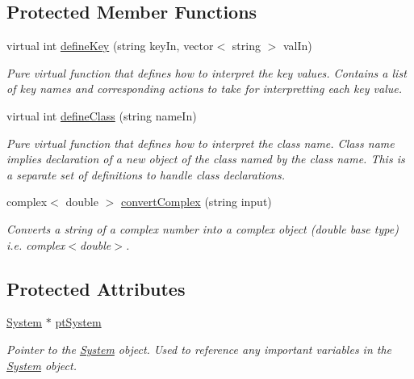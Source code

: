 \subsection*{Protected Member Functions}
\begin{DoxyCompactItemize}
\item 
virtual int \hyperlink{class_dictionary_ad80581bdcda172a72ab700c968ba56bc}{define\-Key} (string key\-In, vector$<$ string $>$ val\-In)
\begin{DoxyCompactList}\small\item\em Pure virtual function that defines how to interpret the key values. Contains a list of key names and corresponding actions to take for interpretting each key value. \end{DoxyCompactList}\item 
virtual int \hyperlink{class_dictionary_ad6715664e1f51882a3a45db82127e6fd}{define\-Class} (string name\-In)
\begin{DoxyCompactList}\small\item\em Pure virtual function that defines how to interpret the class name. Class name implies declaration of a new object of the class named by the class name. This is a separate set of definitions to handle class declarations. \end{DoxyCompactList}\item 
complex$<$ double $>$ \hyperlink{class_dictionary_a0fd256ce693372451aedfa15853557c2}{convert\-Complex} (string input)
\begin{DoxyCompactList}\small\item\em Converts a string of a complex number into a complex object (double base type) i.\-e. complex$<$double$>$. \end{DoxyCompactList}\end{DoxyCompactItemize}
\subsection*{Protected Attributes}
\begin{DoxyCompactItemize}
\item 
\hypertarget{class_dictionary_a18782430a408c043bf666294cb9bcd40}{\hyperlink{class_system}{System} $\ast$ \hyperlink{class_dictionary_a18782430a408c043bf666294cb9bcd40}{pt\-System}}\label{class_dictionary_a18782430a408c043bf666294cb9bcd40}

\begin{DoxyCompactList}\small\item\em Pointer to the \hyperlink{class_system}{System} object. Used to reference any important variables in the \hyperlink{class_system}{System} object. \end{DoxyCompactList}\end{DoxyCompactItemize}
